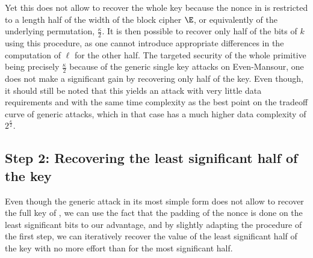 Yet this does not allow to recover the whole key because the nonce in \proestotr is restricted to a length
half of the width of the block cipher $\E$, or equivalently of the underlying \proest permutation,
\ie $\frac{\kappa}{2}$. It is then possible to recover only
half of the bits of $k$ using this procedure, as one cannot introduce appropriate differences in
the computation of $\ell$ for the other half. The targeted security of the
whole primitive being precisely $\frac{\kappa}{2}$ because of the generic single key
attacks on Even-Mansour,
one does not make a significant gain by recovering only half of the key.
Even though, it should still be noted that this yields an
attack with very little data requirements and with the same time complexity as the best
point on the tradeoff curve of generic attacks, which in that case has a much higher data complexity of
$2^\frac{\kappa}{2}$.


\subsection{Step 2: Recovering the least significant half of the key}
\label{sec:reco_lsb}

Even though the generic attack in its most simple form does not allow to recover the full key
of \proestotr,
we can use the fact that the padding of the nonce is done on the least significant
bits to our advantage, and by slightly adapting the procedure of the first step, we can iteratively recover the value
of the least significant half of the key with no more effort than for the most significant half.

